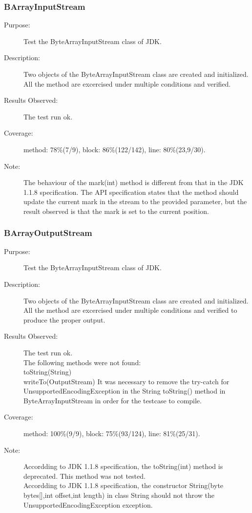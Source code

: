 \subsubsection{BArrayInputStream}
\begin{description}
   \item[Purpose:]
Test the ByteArrayInputStream class of JDK.
    \item[Description:]
Two objects of the ByteArrayInputStream class are created and
initialized. All the method are excercised under multiple conditions
and verified.
    \item[Results Observed:]
    The test run ok.
    \item[Coverage:]
    method: 78\%(7/9), block: 86\%(122/142), line: 80\%(23,9/30).
    \item[Note:]
The behaviour of the mark(int) method is different from that in the
JDK 1.1.8 specification. The API specification states that the
method should update the current mark in the stream to the provided
parameter, but the result observed is that the mark is set to the
current position.

\end{description}

\subsubsection{BArrayOutputStream}
\begin{description}
   \item[Purpose:]
Test the ByteArrayInputStream class of JDK.
    \item[Description:]
Two objects of the ByteArrayInputStream class are created and
initialized. All the method are excercised under multiple conditions
and verified to produce the proper output.
    \item[Results Observed:]
    The test run ok. \\ The following methods were not found:\\
    \textbullet toString(String)\\
    \textbullet writeTo(OutputStream)
    It was necessary to remove the try-catch for UnsupportedEncodingException in the
    String toString() method in ByteArrayInputStream in order for the testcase to compile.
    \item[Coverage:]
    method: 100\%(9/9), block: 75\%(93/124), line: 81\%(25/31).
    \item[Note:]
Accordding to JDK 1.1.8 specification, the toString(int) method is
deprecated. This method was
not tested.\\
Accordding to JDK 1.1.8 specification, the constructor String(byte
bytes[],int offset,int length) in class String should not throw the
UnsupportedEncodingException exception.


\end{description}



